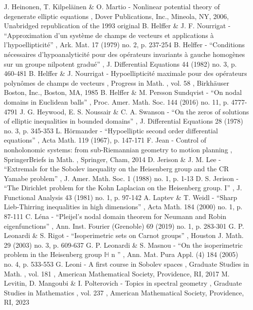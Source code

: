  J. Heinonen, T. Kilpeläinen \& O. Martio - Nonlinear potential theory of degenerate elliptic equations , Dover Publications, Inc., Mineola, NY, 2006, Unabridged republication of the 1993 original
 B. Helffer \& J. F. Nourrigat - “Approximation d’un système de champs de vecteurs et applications à l’hypoellipticité” , Ark. Mat. 17 (1979) no. 2, p. 237-254
 B. Helffer - “Conditions nécessaires d’hypoanalyticité pour des opérateurs invariants à gauche homogènes sur un groupe nilpotent gradué” , J. Differential Equations 44 (1982) no. 3, p. 460-481
 B. Helffer \& J. Nourrigat - Hypoellipticité maximale pour des opérateurs polynômes de champs de vecteurs , Progress in Math. , vol. 58 , Birkhäuser Boston, Inc., Boston, MA, 1985
 B. Helffer \& M. Persson Sundqvist - “On nodal domains in Euclidean balls” , Proc. Amer. Math. Soc. 144 (2016) no. 11, p. 4777-4791
 J. G. Heywood, E. S. Noussair \& C. A. Swanson - “On the zeros of solutions of elliptic inequalities in bounded domains” , J. Differential Equations 28 (1978) no. 3, p. 345-353
 L. Hörmander - “Hypoelliptic second order differential equations” , Acta Math. 119 (1967), p. 147-171
 F. Jean - Control of nonholonomic systems: from sub-Riemannian geometry to motion planning , SpringerBriefs in Math. , Springer, Cham, 2014
 D. Jerison \& J. M. Lee - “Extremals for the Sobolev inequality on the Heisenberg group and the CR Yamabe problem” , J. Amer. Math. Soc. 1 (1988) no. 1, p. 1-13
 D. S. Jerison - “The Dirichlet problem for the Kohn Laplacian on the Heisenberg group. I” , J. Functional Analysis 43 (1981) no. 1, p. 97-142
 A. Laptev \& T. Weidl - “Sharp Lieb-Thirring inequalities in high dimensions” , Acta Math. 184 (2000) no. 1, p. 87-111
 C. Léna - “Pleijel’s nodal domain theorem for Neumann and Robin eigenfunctions” , Ann. Inst. Fourier (Grenoble) 69 (2019) no. 1, p. 283-301
 G. P. Leonardi \& S. Rigot - “Isoperimetric sets on Carnot groups” , Houston J. Math. 29 (2003) no. 3, p. 609-637
 G. P. Leonardi \& S. Masnou - “On the isoperimetric problem in the Heisenberg group $\mathbb{H}$ n ” , Ann. Mat. Pura Appl. (4) 184 (2005) no. 4, p. 533-553
 G. Leoni - A first course in Sobolev spaces , Graduate Studies in Math. , vol. 181 , American Mathematical Society, Providence, RI, 2017
 M. Levitin, D. Mangoubi \& I. Polterovich - Topics in spectral geometry , Graduate Studies in Mathematics , vol. 237 , American Mathematical Society, Providence, RI, 2023
